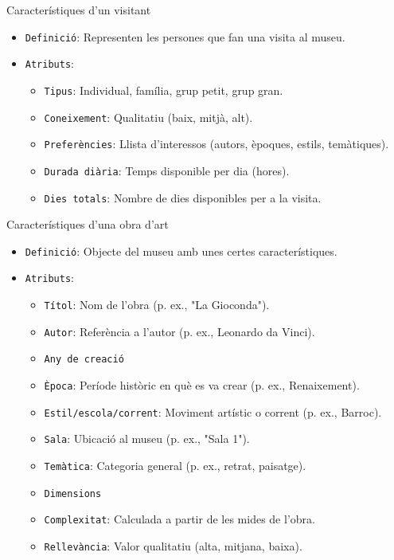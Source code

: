 \documentclass[a4paper]{article}
\begin{document}
	
	Característiques d'un visitant
	\begin{itemize}
		\item \texttt{Definició}: Representen les persones que fan una visita al museu.
		\item \texttt{Atributs}:
		\begin{itemize}
			\item \texttt{Tipus}: Individual, família, grup petit, grup gran.
			\item \texttt{Coneixement}: Qualitatiu (baix, mitjà, alt).
			\item \texttt{Preferències}: Llista d’interessos (autors, èpoques, estils, temàtiques).
			\item \texttt{Durada diària}: Temps disponible per dia (hores).
			\item \texttt{Dies totals}: Nombre de dies disponibles per a la visita.
		\end{itemize}
	\end{itemize}
	
	Característiques d'una obra d'art
	\begin{itemize}
		\item \texttt{Definició}: Objecte del museu amb unes certes característiques.
		\item \texttt{Atributs}:
			\begin{itemize}
				\item \texttt{Títol}: Nom de l’obra (p. ex., "La Gioconda").
				\item \texttt{Autor}: Referència a l’autor (p. ex., Leonardo da Vinci).
				\item \texttt{Any de creació}
				\item \texttt{Època}: Període històric en què es va crear (p. ex., Renaixement).
				\item \texttt{Estil/escola/corrent}: Moviment artístic o corrent (p. ex., Barroc).
				\item \texttt{Sala}: Ubicació al museu (p. ex., "Sala 1").
				\item \texttt{Temàtica}: Categoria general (p. ex., retrat, paisatge).
				\item \texttt{Dimensions}
				\item \texttt{Complexitat}: Calculada a partir de les mides de l'obra.
				\item \texttt{Rellevància}: Valor qualitatiu (alta, mitjana, baixa).
			\end{itemize}
	\end{itemize}
	
\end{document}
